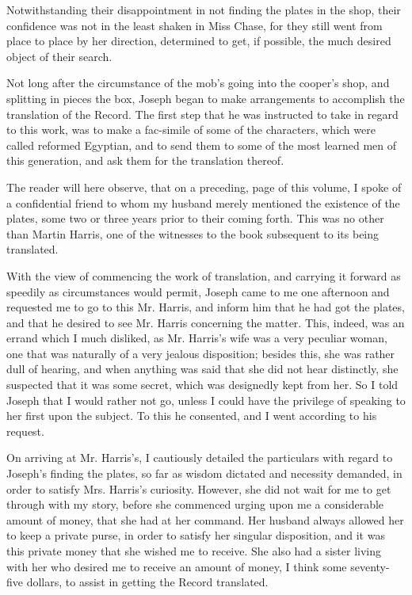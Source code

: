 		Notwithstanding their disappointment in not finding the plates in the shop, their confidence was not in the least shaken in Miss Chase, for they still went from place to place by her direction, determined to get, if possible, the much desired object of their search.

		Not long after the circumstance of the mob's going into the cooper's shop, and splitting in pieces the box, Joseph began to make arrangements to accomplish the translation of the Record. The first step that he was instructed to take in regard to this work, was to make a fac-simile of some of the characters, which were called reformed Egyptian, and to send them to some of the most learned men of this generation, and ask them for the translation thereof.

		The reader will here observe, that on a preceding, page of this volume, I spoke of a confidential friend to whom my husband merely mentioned the existence of the plates, some two or three years prior to their coming forth. This was no other than Martin Harris, one of the witnesses to the book subsequent to its being translated.

		With the view of commencing the work of translation, and carrying it forward as speedily as circumstances would permit, Joseph came to me one afternoon and requested me to go to this Mr. Harris, and inform him that he had got the plates, and that he desired to see Mr. Harris concerning the matter. This, indeed, was an errand which I much disliked, as Mr. Harris's wife was a very peculiar woman, one that was naturally of a very jealous disposition; besides this, she was rather dull of hearing, and when anything was said that she did not hear distinctly, she suspected that it was some secret, which was designedly kept from her. So I told Joseph that I would rather not go, unless I could have the privilege of speaking to her first upon the subject. To this he consented, and I went according to his request.

		On arriving at Mr. Harris's, I cautiously detailed the particulars with regard to Joseph's finding the plates, so far as wisdom dictated and necessity demanded, in order to satisfy Mrs. Harris's curiosity. However, she did not wait for me to get through with my story, before she commenced urging upon me a considerable amount of money, that she had at her command. Her husband always allowed her to keep a private purse, in order to satisfy her singular disposition, and it was this private money that she wished me to receive. She also had a sister living with her who desired me to receive an amount of money, I think some seventy-five dollars, to assist in getting the Record translated.

